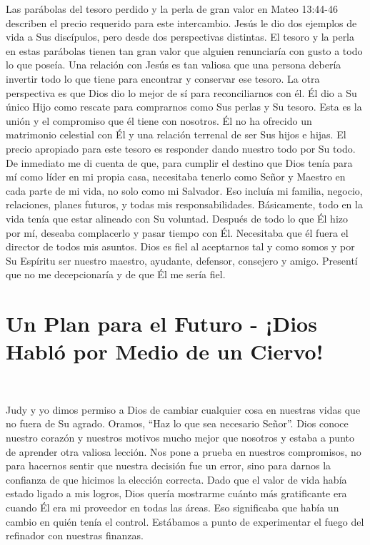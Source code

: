 \documentclass[twoside, 12pt]{book}
\begin{document}
Las parábolas del tesoro perdido y la perla de gran valor en Mateo 13:44-46 describen el precio requerido para este intercambio. Jesús le dio dos ejemplos de vida a Sus discípulos, pero desde dos perspectivas distintas. El tesoro y la perla en estas parábolas tienen tan gran valor que alguien renunciaría con gusto a todo lo que poseía. Una relación con Jesús es tan valiosa que una persona debería invertir todo lo que tiene para encontrar y conservar ese tesoro. La otra perspectiva es que Dios dio lo mejor de sí para reconciliarnos con él. Él dio a Su único Hijo como rescate para comprarnos como Sus perlas y Su tesoro. Esta es la unión y el compromiso que él tiene con nosotros. Él no ha ofrecido un matrimonio celestial con Él y una relación terrenal de ser Sus hijos e hijas. El precio apropiado para este tesoro es responder dando nuestro todo por Su todo.\\

De inmediato me di cuenta de que, para cumplir el destino que Dios tenía para mí como líder en mi propia casa, necesitaba tenerlo como Señor y Maestro en cada parte de mi vida, no solo como mi Salvador. Eso incluía mi familia, negocio, relaciones, planes futuros, y todas mis responsabilidades. Básicamente, todo en la vida tenía que estar alineado con Su voluntad. Después de todo lo que Él hizo por mí, deseaba complacerlo y pasar tiempo con Él. Necesitaba que él fuera el director de todos mis asuntos. Dios es fiel al aceptarnos tal y como somos y por Su Espíritu ser nuestro maestro, ayudante, defensor, consejero y amigo. Presentí que no me decepcionaría y de que Él me sería fiel.\\



\chapter{Un Plan para el Futuro - ¡Dios Habló por Medio de un Ciervo!}
\

Judy y yo dimos permiso a Dios de cambiar cualquier cosa en nuestras vidas que no fuera de Su agrado. Oramos, “Haz lo que sea necesario Señor”. Dios conoce nuestro corazón y nuestros motivos mucho mejor que nosotros y estaba a punto de aprender otra valiosa lección. Nos pone a prueba en nuestros compromisos, no para hacernos sentir que nuestra decisión fue un error, sino para darnos la confianza de que hicimos la elección correcta. Dado que el valor de vida había estado ligado a mis logros, Dios quería mostrarme cuánto más gratificante era cuando Él era mi proveedor en todas las áreas. Eso significaba que había un cambio en quién tenía el control. Estábamos a punto de experimentar el fuego del refinador con nuestras finanzas.\\
\end{document}
